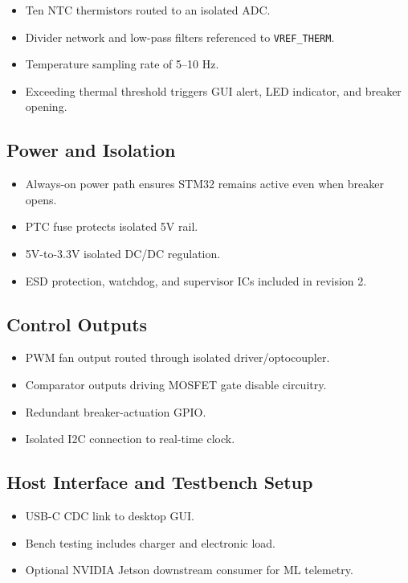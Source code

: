 \documentclass[12pt]{article}
\begin{document}
\begin{itemize}
\item Ten NTC thermistors routed to an isolated ADC.
\item Divider network and low-pass filters referenced to \texttt{VREF\_THERM}.
\item Temperature sampling rate of 5--10 Hz.
\item Exceeding thermal threshold triggers GUI alert, LED indicator, and breaker opening.
\end{itemize}

\subsection{Power and Isolation}

\begin{itemize}
\item Always-on power path ensures STM32 remains active even when breaker opens.
\item PTC fuse protects isolated 5V rail.
\item 5V-to-3.3V isolated DC/DC regulation.
\item ESD protection, watchdog, and supervisor ICs included in revision 2.
\end{itemize}

\subsection{Control Outputs}

\begin{itemize}
\item PWM fan output routed through isolated driver/optocoupler.
\item Comparator outputs driving MOSFET gate disable circuitry.
\item Redundant breaker-actuation GPIO.
\item Isolated I2C connection to real-time clock.
\end{itemize}

\subsection{Host Interface and Testbench Setup}

\begin{itemize}
\item USB-C CDC link to desktop GUI.
\item Bench testing includes charger and electronic load.
\item Optional NVIDIA Jetson downstream consumer for ML telemetry.
\end{itemize}
\end{document}

